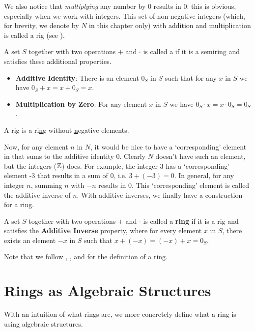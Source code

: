 We also notice that \textit{multiplying} any number by 0 results in 0: this is obvious, especially when we work with integers. This set of non-negative integers (which, for brevity, we denote by $N$ in this chapter only) with addition and multiplication is called a rig (see \cite{proofwiki_rig-definition}).
\begin{definition}
    A set $S$ together with two operations $+$ and $\cdot$ is called a  if it is a semiring and satisfies these additional properties.
    \begin{itemize}
        \item \textbf{Additive Identity}: There is an element $0_S$ in $S$ such that for any $x$ in $S$ we have $0_S + x = x + 0_S = x$.
        \item \textbf{Multiplication by Zero}: For any element $x$ in $S$ we have $0_S \cdot x = x \cdot 0_S = 0_S$.
    \end{itemize}
\end{definition}
\begin{remark}
    A rig is a ri\underline{n}g without \underline{n}egative elements.
\end{remark}

Now, for any element $n$ in $N$, it would be nice to have a `corresponding' element in that sums to the additive identity 0. Clearly $N$ doesn't have such an element, but the integers ($\mathbb{Z}$) does. For example, the integer 3 has a `corresponding' element -3 that results in a sum of 0, i.e. $3 + (-3) = 0$. In general, for any integer $n$, summing $n$ with $-n$ results in 0. This `corresponding' element is called the additive inverse of $n$. With additive inverses, we finally have a construction for a ring.

\begin{definition}
    A set $S$ together with two operations $+$ and $\cdot$ is called a \textbf{ring} if it is a rig and satisfies the \textbf{Additive Inverse} property, where for every element $x$ in $S$, there exists an element $-x$ in $S$ such that $x + (-x) = (-x) + x = 0_S$.
\end{definition}
\begin{remark}
    Note that we follow \cite[p.~223]{dummit_foote_2004}, \cite[p.~115, Definition 1.1]{hungerford_1980}, and \cite{proofwiki_ring-definition} for the definition of a ring.
\end{remark}

\section{Rings as Algebraic Structures}
With an intuition of what rings are, we more concretely define what a ring is using algebraic structures.

